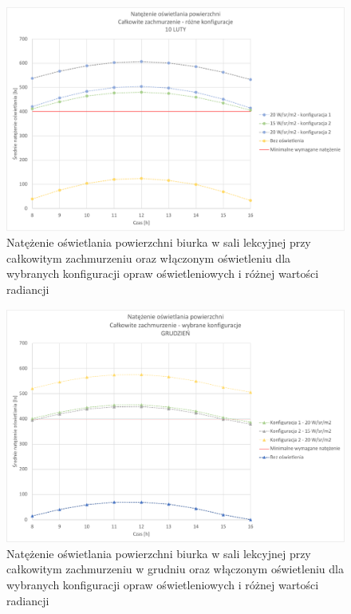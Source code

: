 \documentclass[a4paper,12pt]{article}
\begin{document}
	\begin{figure}[!ht]
		\centering
		\includegraphics[scale=0.8]{Wykresy/oswietlenie_calkowite_zachmurzenie_rozne_konfiguracje.pdf}
		\caption{Natężenie oświetlania powierzchni biurka w sali lekcyjnej przy całkowitym zachmurzeniu  oraz włączonym oświetleniu dla wybranych konfiguracji opraw oświetleniowych i różnej wartości radiancji}
		\label{oswietlenie_calkowite_zachmurzenie_rozne_konfiguracje}
	\end{figure}

	\begin{figure}[!ht]
		\centering
		\includegraphics[scale=0.8]{Wykresy/grudzien_oswietlenie_calkowite_zachmurzenie_rozne_konfiguracje.pdf}
		\caption{Natężenie oświetlania powierzchni biurka w sali lekcyjnej przy całkowitym zachmurzeniu  w grudniu oraz włączonym oświetleniu dla wybranych konfiguracji opraw oświetleniowych i różnej wartości radiancji}
		\label{grudzien_oswietlenie_calkowite_zachmurzenie_rozne_konfiguracje}
	\end{figure}	
\end{document}
